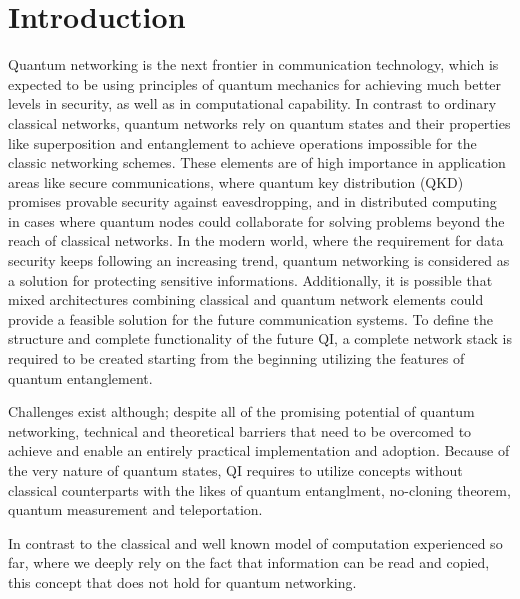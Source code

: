 \documentclass[12pt]{ieeetj}
\begin{document}
        \section{Introduction}

		Quantum networking is the next frontier in communication technology,
		which is expected to be using principles of quantum mechanics for
		achieving much better levels in security, as well as in computational capability.
		In contrast to ordinary classical networks, quantum networks rely on quantum states
		and their properties like superposition and entanglement to achieve operations impossible for
	        the classic networking schemes. These elements are of high importance in 
		application areas like secure communications, where quantum key distribution (QKD) 
		promises provable security against eavesdropping, and in distributed computing in cases 
		where quantum nodes could collaborate for solving problems beyond the reach of classical networks.
		In the modern world, where the requirement for data security keeps following
		an increasing trend, quantum networking is considered as a  solution
		for protecting sensitive informations.
		Additionally, it is possible that mixed architectures combining classical and quantum network elements
		could provide a feasible solution for the future communication systems. 
		To define the structure and complete functionality of the future QI,
		a complete network stack is required to be created starting from the beginning utilizing 
		the features of quantum entanglement\cite{rfc}.

		Challenges exist although; despite all of the promising potential of quantum networking,
		technical and theoretical barriers that need to be overcomed
		to achieve and enable an entirely practical implementation and adoption.
		Because of the very nature of quantum states, QI requires to 
		utilize concepts without classical counterparts with the likes of quantum entanglment,
		no-cloning theorem, quantum measurement and teleportation.
		
		In contrast to the classical and well known model of computation experienced so far,
		where we deeply rely on the fact that information can be read and copied, this concept that does not hold
		for quantum networking. 
		
\end{document}
